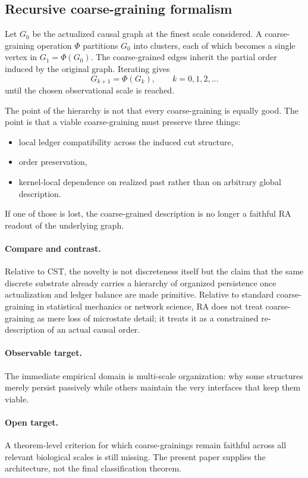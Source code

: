 \documentclass[11pt]{article}
\def\dots{...}%
\begin{document}
\subsection{Recursive coarse-graining formalism}
\label{sec:coarse_grain}

Let $G_0$ be the actualized causal graph at the finest scale considered. A coarse-graining operation $\Phi$ partitions $G_0$ into clusters, each of which becomes a single vertex in $G_1 = \Phi(G_0)$. The coarse-grained edges inherit the partial order induced by the original graph. Iterating gives
\[
G_{k+1} = \Phi(G_k), \qquad k=0,1,2,\dots
\]
until the chosen observational scale is reached.

The point of the hierarchy is not that every coarse-graining is equally good. The point is that a viable coarse-graining must preserve three things:
\begin{itemize}[nosep]
    \item local ledger compatibility across the induced cut structure,
    \item order preservation,
    \item kernel-local dependence on realized past rather than on arbitrary global description.
\end{itemize}
If one of those is lost, the coarse-grained description is no longer a faithful RA readout of the underlying graph.

\paragraph{Compare and contrast.} Relative to CST, the novelty is not discreteness itself but the claim that the same discrete substrate already carries a hierarchy of organized persistence once actualization and ledger balance are made primitive. Relative to standard coarse-graining in statistical mechanics or network science, RA does not treat coarse-graining as mere loss of microstate detail; it treats it as a constrained re-description of an actual causal order.

\paragraph{Observable target.} The immediate empirical domain is multi-scale organization: why some structures merely persist passively while others maintain the very interfaces that keep them viable.

\paragraph{Open target.} A theorem-level criterion for which coarse-grainings remain faithful across all relevant biological scales is still missing. The present paper supplies the architecture, not the final classification theorem.
\end{document}
